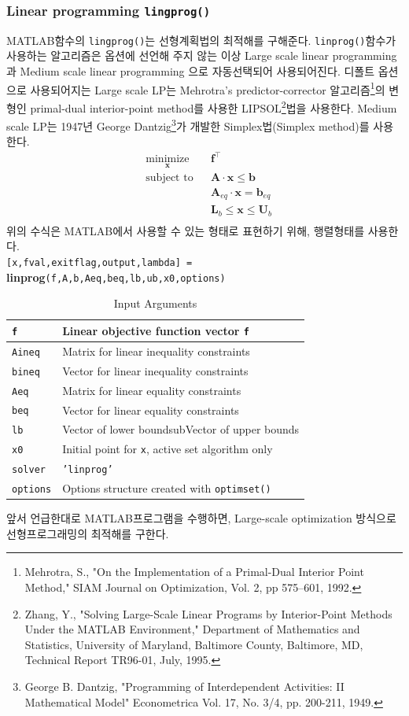 \subsubsection{Linear programming \texttt{lingprog()}}
MATLAB함수의 \texttt{lingprog()}는 선형계획법의 최적해를 구해준다. \texttt{linprog()}함수가 사용하는 알고리즘은 옵션에 선언해 주지 않는 이상 Large scale linear programming과 Medium scale linear programming 으로 자동선택되어 사용되어진다. 디폴트 옵션으로 사용되어지는 Large scale LP는 Mehrotra's predictor-corrector 알고리즘\footnote{Mehrotra, S., "On the Implementation of a Primal-Dual Interior Point Method," SIAM Journal on Optimization, Vol. 2, pp 575–601, 1992.}의 변형인 primal-dual interior-point method를 사용한 LIPSOL\footnote{Zhang, Y., "Solving Large-Scale Linear Programs by Interior-Point Methods Under the MATLAB Environment," Department of Mathematics and Statistics, University of Maryland, Baltimore County, Baltimore, MD, Technical Report TR96-01, July, 1995.}법을 사용한다. Medium scale LP는 1947년 George Dantzig\footnote{George B. Dantzig, "Programming of Interdependent Activities: II Mathematical Model" Econometrica Vol. 17, No. 3/4, pp. 200-211, 1949.}가 개발한 Simplex법(Simplex method)를 사용한다.
\begin{equation*}
\begin{aligned}
& \underset{\mathbf{x}}{\text{minimize}}& & \mathbf{f}^{\top}\\
& \text{subject to}& & \mathbf{A}\cdot\mathbf{x}\leq\mathbf{b}\\
& & & \mathbf{A}_{eq}\cdot\mathbf{x}=\mathbf{b}_{eq}\\
& & & \mathbf{L}_{b}\leq\mathbf{x}\leq\mathbf{U}_{b}\\
\end{aligned}
\end{equation*}
위의 수식은 MATLAB에서 사용할 수 있는 형태로 표현하기 위해, 행렬형태를 사용한다. \\
\texttt{[x,fval,exitflag,output,lambda] = }\textbf{linprog}\texttt{(f,A,b,Aeq,beq,lb,ub,x0,options)}
\begin{table}[!hbt]
\centering
\begin{tabular}{l|l}
\hline\hline
\texttt{f}& Linear objective function vector \texttt{f}\\\hline
\texttt{Aineq}& Matrix for linear inequality constraints\\\hline
\texttt{bineq}& Vector for linear inequality constraints\\\hline
\texttt{Aeq}& Matrix for linear equality constraints\\\hline
\texttt{beq}& Vector for linear equality constraints\\\hline
\texttt{lb}& Vector of lower boundsubVector of upper bounds\\\hline
\texttt{x0}& Initial point for \texttt{x}, active set algorithm only\\\hline
\texttt{solver}& \texttt{'linprog'}\\\hline
\texttt{options}& Options structure created with \texttt{optimset()}\\
\hline\hline
\end{tabular}
\caption{Input Arguments}
\end{table}
앞서 언급한대로 MATLAB프로그램을 수행하면, Large-scale optimization 방식으로 선형프로그래밍의 최적해를 구한다.
 